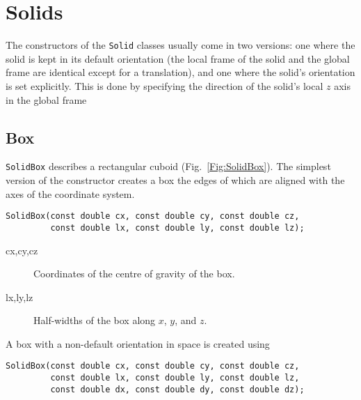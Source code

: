 \chapter{Solids}\label{Sec:Solids}
The constructors of the \texttt{Solid} classes usually come in two versions:
one where the solid is kept in its default orientation 
(\ie the local frame of the solid and the global frame are identical 
except for a translation), and one where the solid's orientation is set 
explicitly. This is done by specifying the direction of the solid's local 
$z$ axis in the global frame
\section{Box}
\texttt{SolidBox} describes a rectangular cuboid (Fig.~\ref{Fig:SolidBox}).
The simplest version of the constructor creates a box the edges of which 
are aligned with the axes of the coordinate system. 
\begin{lstlisting}
SolidBox(const double cx, const double cy, const double cz, 
         const double lx, const double ly, const double lz);
\end{lstlisting}
\begin{description}
\item[cx,cy,cz] Coordinates of the centre of gravity of the box.
\item[lx,ly,lz] Half-widths of the box along $x$, $y$, and $z$.
\end{description}
A box with a non-default orientation in space is created using
\begin{lstlisting}
SolidBox(const double cx, const double cy, const double cz, 
         const double lx, const double ly, const double lz, 
         const double dx, const double dy, const double dz);
\end{lstlisting} 

